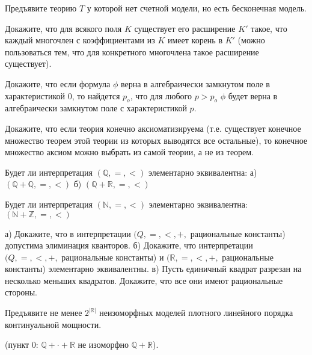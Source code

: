 \setcounter{curtask}{27}


\begin{task}
    Предъявите теорию $T$ у которой нет счетной модели, но есть бесконечная модель.
\end{task}

\begin{task}
    Докажите, что для всякого поля $K$ существует его расширение $K'$
    такое, что каждый многочлен с коэффициентами из $K$ имеет корень
    в $K'$ (можно пользоваться тем, что для конкретного многочлена
    такое расширение существует).
\end{task}

\begin{task}
    Докажите, что если формула $\phi$ верна в алгебраически замкнутом
    поле в характеристикой 0, то найдется $p_o$, что для любого $p >
    p_o$ $\phi$ будет верна в алгебраически замкнутом поле с
    характеристикой $p$.
\end{task}

\begin{task}
    Докажите, что если теория конечно аксиоматизируема
    (т.е. существует конечное множество теорем этой теории из которых выводятся все
    остальные), то конечное множество аксиом можно выбрать из самой
    теории, а не из теорем.
\end{task}


\breakline

\begin{ptask}{22}
    Будет ли интерпретация $(\mathbb{Q}, =, <)$ элементарно
    эквивалентна:
    а) $(\mathbb{Q} + \mathbb{Q}, =, <)$
    б) $(\mathbb{Q} + \mathbb{R}, =, <)$
\end{ptask}

\begin{ptask}{23}
    Будет ли интерпретация $(\mathbb{N}, =, <)$ элементарно
    эквивалентна: $(\mathbb{N} + \mathbb{Z}, =, <)$
\end{ptask}

\begin{ptask}{24}
    а) Докажите, что в интерпретации $(Q, =, <, +,$ рациональные
    константы) допустима элиминация кванторов.
    б) Докажите, что интерпретации $(Q, =, <, +,$ рациональные
    константы) и $(\mathbb{R}, =, <, +,$ рациональные константы)
    элементарно эквивалентны.
    в) Пусть единичный квадрат разрезан на несколько меньших
    квадратов. Докажите, что все они имеют рациональные стороны.
\end{ptask}

\begin{ptask}{26}
    Предъявите не менее $2^{|\mathbb{R}|}$ неизоморфных моделей плотного линейного
    порядка континуальной мощности.

    (пункт 0: $\mathbb{Q} + \cdot + \mathbb{R}$ не изоморфно $\mathbb{Q} +
    \mathbb{R}$).
\end{ptask}
